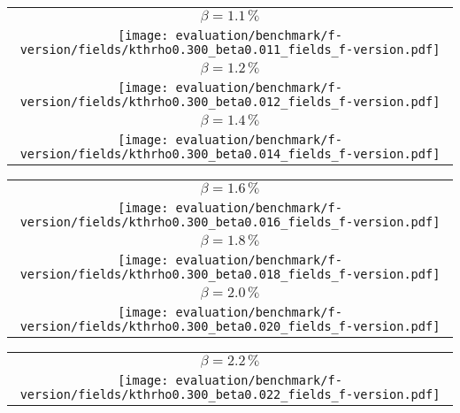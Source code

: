 \begin{center}
    \begin{tabular}{c}
        $ \beta = 1.1\,\%$ \\
        \texttt{[image: evaluation/benchmark/f-version/fields/kthrho0.300\_beta0.011\_fields\_f-version.pdf]} \\
        $ \beta = 1.2\,\%$ \\
        \texttt{[image: evaluation/benchmark/f-version/fields/kthrho0.300\_beta0.012\_fields\_f-version.pdf]} \\
        $ \beta = 1.4\,\%$ \\
        \texttt{[image: evaluation/benchmark/f-version/fields/kthrho0.300\_beta0.014\_fields\_f-version.pdf]} \\
    \end{tabular}
\end{center}

\begin{center}
    \begin{tabular}{c}
        $ \beta = 1.6\,\%$ \\
        \texttt{[image: evaluation/benchmark/f-version/fields/kthrho0.300\_beta0.016\_fields\_f-version.pdf]} \\
        $ \beta = 1.8\,\%$ \\
        \texttt{[image: evaluation/benchmark/f-version/fields/kthrho0.300\_beta0.018\_fields\_f-version.pdf]} \\
        $ \beta = 2.0\,\%$ \\
        \texttt{[image: evaluation/benchmark/f-version/fields/kthrho0.300\_beta0.020\_fields\_f-version.pdf]} \\
    \end{tabular}
\end{center}

\begin{center}
    \begin{tabular}{c}
        $ \beta = 2.2\,\%$ \\
        \texttt{[image: evaluation/benchmark/f-version/fields/kthrho0.300\_beta0.022\_fields\_f-version.pdf]} \\
    \end{tabular}
\end{center}